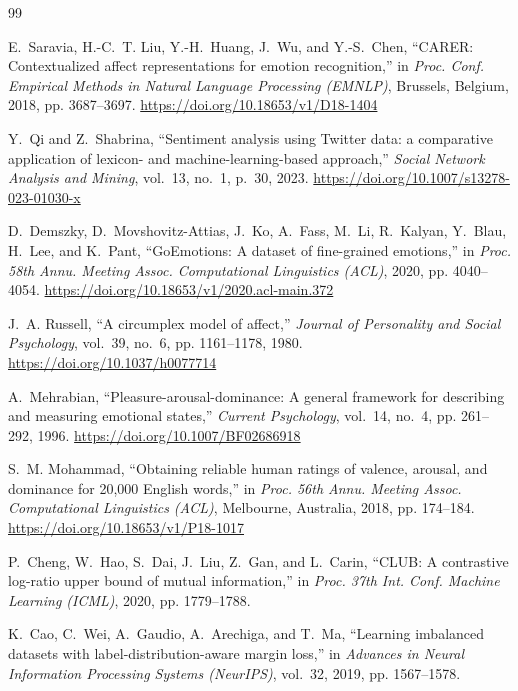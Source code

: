 \documentclass[journal,twocolumn]{article}
\begin{document}
\begin{thebibliography}{99}
\small
\setlength{\itemsep}{1pt}
\setlength{\parskip}{0pt}

E.~Saravia, H.-C.~T. Liu, Y.-H.~Huang, J.~Wu, and Y.-S.~Chen, ``CARER: Contextualized affect representations for emotion recognition,'' in \emph{Proc. Conf. Empirical Methods in Natural Language Processing (EMNLP)}, Brussels, Belgium, 2018, pp. 3687--3697. \url{https://doi.org/10.18653/v1/D18-1404}

Y.~Qi and Z.~Shabrina, ``Sentiment analysis using Twitter data: a comparative application of lexicon- and machine-learning-based approach,'' \emph{Social Network Analysis and Mining}, vol.~13, no.~1, p.~30, 2023. \url{https://doi.org/10.1007/s13278-023-01030-x}

D.~Demszky, D.~Movshovitz-Attias, J.~Ko, A.~Fass, M.~Li, R.~Kalyan, Y.~Blau, H.~Lee, and K.~Pant, ``GoEmotions: A dataset of fine-grained emotions,'' in \emph{Proc. 58th Annu. Meeting Assoc. Computational Linguistics (ACL)}, 2020, pp. 4040--4054. \url{https://doi.org/10.18653/v1/2020.acl-main.372}

J.~A. Russell, ``A circumplex model of affect,'' \emph{Journal of Personality and Social Psychology}, vol.~39, no.~6, pp. 1161--1178, 1980. \url{https://doi.org/10.1037/h0077714}

A.~Mehrabian, ``Pleasure-arousal-dominance: A general framework for describing and measuring emotional states,'' \emph{Current Psychology}, vol.~14, no.~4, pp. 261--292, 1996. \url{https://doi.org/10.1007/BF02686918}

S.~M. Mohammad, ``Obtaining reliable human ratings of valence, arousal, and dominance for 20,000 English words,'' in \emph{Proc. 56th Annu. Meeting Assoc. Computational Linguistics (ACL)}, Melbourne, Australia, 2018, pp. 174--184. \url{https://doi.org/10.18653/v1/P18-1017}

P.~Cheng, W.~Hao, S.~Dai, J.~Liu, Z.~Gan, and L.~Carin, ``CLUB: A contrastive log-ratio upper bound of mutual information,'' in \emph{Proc. 37th Int. Conf. Machine Learning (ICML)}, 2020, pp. 1779--1788.

K.~Cao, C.~Wei, A.~Gaudio, A.~Arechiga, and T.~Ma, ``Learning imbalanced datasets with label-distribution-aware margin loss,'' in \emph{Advances in Neural Information Processing Systems (NeurIPS)}, vol.~32, 2019, pp. 1567--1578.


\end{thebibliography}
\end{document}
